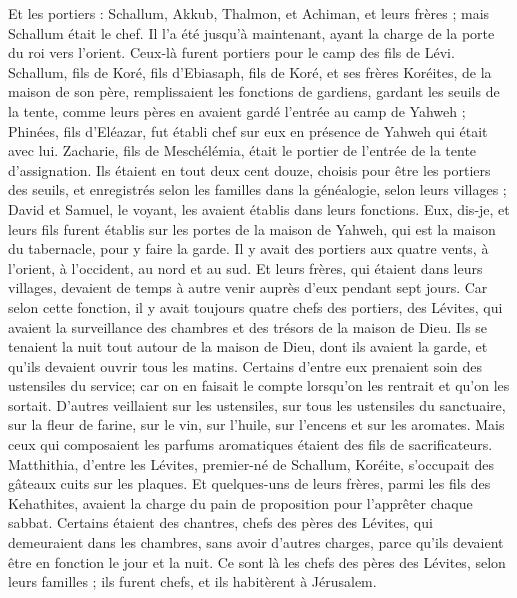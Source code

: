 \begin{multicols}{2}
Et les portiers : Schallum, Akkub, Thalmon, et Achiman, et leurs frères ; mais Schallum était le chef.
Il l'a été jusqu'à maintenant, ayant la charge de la porte du roi vers l'orient. Ceux-là furent portiers pour le camp des fils de Lévi.
Schallum, fils de Koré, fils d'Ebiasaph, fils de Koré, et ses frères Koréites, de la maison de son père, remplissaient les fonctions de gardiens, gardant les seuils de la tente, comme leurs pères en avaient gardé l'entrée au camp de Yahweh ;
Phinées, fils d'Eléazar, fut établi chef sur eux en présence de Yahweh qui était avec lui.
Zacharie, fils de Meschélémia, était le portier de l'entrée de la tente d'assignation.
Ils étaient en tout deux cent douze, choisis pour être les portiers des seuils, et enregistrés selon les familles dans la généalogie, selon leurs villages ; David et Samuel, le voyant, les avaient établis dans leurs fonctions.
Eux, dis-je, et leurs fils furent établis sur les portes de la maison de Yahweh, qui est la maison du tabernacle, pour y faire la garde.
Il y avait des portiers aux quatre vents, à l'orient, à l'occident, au nord et au sud.
Et leurs frères, qui étaient dans leurs villages, devaient de temps à autre venir auprès d'eux pendant sept jours.
Car selon cette fonction, il y avait toujours quatre chefs des portiers, des Lévites, qui avaient la surveillance des chambres et des trésors de la maison de Dieu.
Ils se tenaient la nuit tout autour de la maison de Dieu, dont ils avaient la garde, et qu'ils devaient ouvrir tous les matins.
Certains d'entre eux prenaient soin des ustensiles du service; car on en faisait le compte lorsqu'on les rentrait et qu'on les sortait.
D'autres veillaient sur les ustensiles, sur tous les ustensiles du sanctuaire, sur la fleur de farine, sur le vin, sur l'huile, sur l'encens et sur les aromates.
Mais ceux qui composaient les parfums aromatiques étaient des fils de sacrificateurs.
Matthithia, d'entre les Lévites, premier-né de Schallum, Koréite, s'occupait des gâteaux cuits sur les plaques.
Et quelques-uns de leurs frères, parmi les fils des Kehathites, avaient la charge du pain de proposition pour l'apprêter chaque sabbat.
Certains étaient des chantres, chefs des pères des Lévites, qui demeuraient dans les chambres, sans avoir d'autres charges, parce qu'ils devaient être en fonction le jour et la nuit.
Ce sont là les chefs des pères des Lévites, selon leurs familles ; ils furent chefs, et ils habitèrent à Jérusalem.

\end{multicols}
